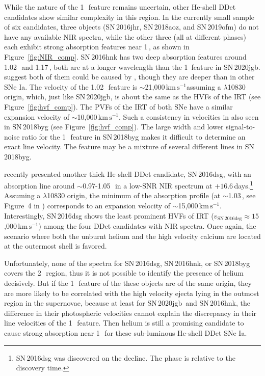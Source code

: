 \documentclass[twocolumn]{aastex631}
\newcommand{\sn}{SN\,2020jgb}
\newcommand{\kms}{$\mathrm{km}\,\mathrm{s}^{-1}$}
\begin{document}
While the nature of the 1\,\micron\ feature remains uncertain, other He-shell DDet candidates show similar complexity in this region. In the currently small sample of six candidates, three objects (SN\,2016jhr, SN\,2018aoz, and SN\,2019ofm) do not have any available NIR spectra, while the other three (all at different phases) each exhibit strong absorption features near 1\,\micron, as shown in Figure~\ref{fig:NIR_comp}. SN\,2016hnk has two deep absorption features around 1.02\,\micron\ and 1.17\,\micron, both are at a longer wavelength than the 1\micron\ feature in \sn. \citet{galbany_16hnk_2019} suggest both of them could be caused by , though they are deeper than in other SNe Ia. The velocity of the 1.02\,\micron\ feature is $\sim$21,000\,\kms assuming a  $\lambda$10830 origin, which, just like \sn, is about the same as the HVFs of the  IRT (see Figure~\ref{fig:hvf_comp}). The PVFs of the  IRT of both SNe have a similar expansion velocity of $\sim$10,000\,\kms. Such a consistency in velocities in also seen in SN\,2018byg (see Figure~\ref{fig:hvf_comp}). The large width and lower signal-to-noise ratio for the 1\,\micron\ feature in SN\,2018byg makes it difficult to determine an exact line velocity. The feature may be a mixture of several different lines in SN\,2018byg. 

\citet{Dong_16dsg_2022} recently presented another thick He-shell DDet candidate, SN\,2016dsg, with an absorption line around $\sim$0.97-1.05\,\micron\ in a low-SNR NIR spectrum at $+16.6$\,days.\footnote{SN\,2016dsg was discovered on the decline. The phase is relative to the discovery time.} Assuming a  $\lambda$10830 origin, the minimum of the absorption profile (at $\sim$1.03\,\micron, see Figure~4 in \citealp{Dong_16dsg_2022}) corresponds to an expansion velocity of $\sim$15,000\,\kms. Interestingly, SN\,2016dsg shows the least prominent HVFs of  IRT ($v_\mathrm{SN\,2016dsg} \approx 15$,000\,\kms) among the four DDet candidates with NIR spectra. Once again, the scenario where both the unburnt helium and the high velocity calcium are located at the outermost shell is favored.

Unfortunately, none of the spectra for SN\,2016dsg, SN\,2016hnk, or SN\,2018byg covers the 2\,\micron\ region, thus it is not possible to identify the presence of helium decisively. But if the 1\,\micron\ feature of the these objects are of the same origin, they are more likely to be correlated with the high velocity ejecta lying in the outmost region in the supernovae, because at least for \sn\ and SN\,2016hnk, the difference in their photospheric velocities cannot explain the discrepancy in their line velocities of the 1\,\micron\ feature. Then helium is still a promising candidate to cause strong absorption near 1\,\micron\ for these sub-luminous He-shell DDet SNe Ia. 
\end{document}
